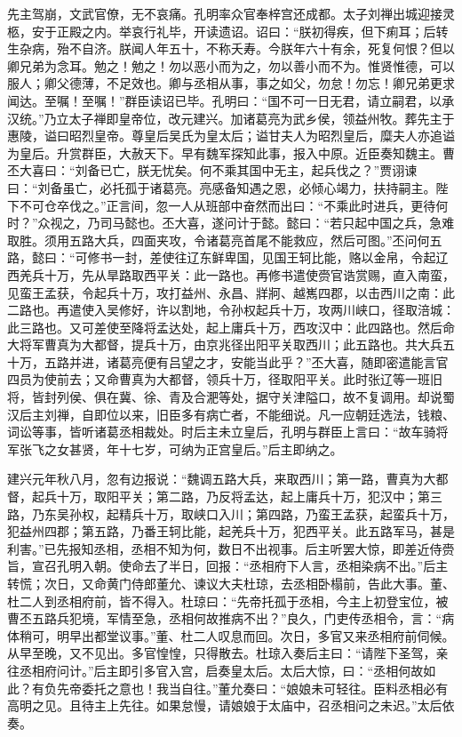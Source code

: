 先主驾崩，文武官僚，无不哀痛。孔明率众官奉梓宫还成都。太子刘禅出城迎接灵柩，安于正殿之内。举哀行礼毕，开读遗诏。诏曰：“朕初得疾，但下痢耳；后转生杂病，殆不自济。朕闻人年五十，不称夭寿。今朕年六十有余，死复何恨？但以卿兄弟为念耳。勉之！勉之！勿以恶小而为之，勿以善小而不为。惟贤惟德，可以服人；卿父德薄，不足效也。卿与丞相从事，事之如父，勿怠！勿忘！卿兄弟更求闻达。至嘱！至嘱！”群臣读诏已毕。孔明曰：“国不可一日无君，请立嗣君，以承汉统。”乃立太子禅即皇帝位，改元建兴。加诸葛亮为武乡侯，领益州牧。葬先主于惠陵，谥曰昭烈皇帝。尊皇后吴氏为皇太后；谥甘夫人为昭烈皇后，糜夫人亦追谥为皇后。升赏群臣，大赦天下。早有魏军探知此事，报入中原。近臣奏知魏主。曹丕大喜曰：“刘备已亡，朕无忧矣。何不乘其国中无主，起兵伐之？”贾诩谏曰：“刘备虽亡，必托孤于诸葛亮。亮感备知遇之恩，必倾心竭力，扶持嗣主。陛下不可仓卒伐之。”正言间，忽一人从班部中奋然而出曰：“不乘此时进兵，更待何时？”众视之，乃司马懿也。丕大喜，遂问计于懿。懿曰：“若只起中国之兵，急难取胜。须用五路大兵，四面夹攻，令诸葛亮首尾不能救应，然后可图。”丕问何五路，懿曰：“可修书一封，差使往辽东鲜卑国，见国王轲比能，赂以金帛，令起辽西羌兵十万，先从旱路取西平关：此一路也。再修书遣使赍官诰赏赐，直入南蛮，见蛮王孟获，令起兵十万，攻打益州、永昌、牂牁、越嶲四郡，以击西川之南：此二路也。再遣使入吴修好，许以割地，令孙权起兵十万，攻两川峡口，径取涪城：此三路也。又可差使至降将孟达处，起上庸兵十万，西攻汉中：此四路也。然后命大将军曹真为大都督，提兵十万，由京兆径出阳平关取西川；此五路也。共大兵五十万，五路并进，诸葛亮便有吕望之才，安能当此乎？”丕大喜，随即密遣能言官四员为使前去；又命曹真为大都督，领兵十万，径取阳平关。此时张辽等一班旧将，皆封列侯、俱在冀、徐、青及合淝等处，据守关津隘口，故不复调用。却说蜀汉后主刘禅，自即位以来，旧臣多有病亡者，不能细说。凡一应朝廷选法，钱粮、词讼等事，皆听诸葛丞相裁处。时后主未立皇后，孔明与群臣上言曰：“故车骑将军张飞之女甚贤，年十七岁，可纳为正宫皇后。”后主即纳之。

建兴元年秋八月，忽有边报说：“魏调五路大兵，来取西川；第一路，曹真为大都督，起兵十万，取阳平关；第二路，乃反将孟达，起上庸兵十万，犯汉中；第三路，乃东吴孙权，起精兵十万，取峡口入川；第四路，乃蛮王孟获，起蛮兵十万，犯益州四郡；第五路，乃番王轲比能，起羌兵十万，犯西平关。此五路军马，甚是利害。”已先报知丞相，丞相不知为何，数日不出视事。后主听罢大惊，即差近侍赍旨，宣召孔明入朝。使命去了半日，回报：“丞相府下人言，丞相染病不出。”后主转慌；次日，又命黄门侍郎董允、谏议大夫杜琼，去丞相卧榻前，告此大事。董、杜二人到丞相府前，皆不得入。杜琼曰：“先帝托孤于丞相，今主上初登宝位，被曹丕五路兵犯境，军情至急，丞相何故推病不出？”良久，门吏传丞相令，言：“病体稍可，明早出都堂议事。”董、杜二人叹息而回。次日，多官又来丞相府前伺候。从早至晚，又不见出。多官惶惶，只得散去。杜琼入奏后主曰：“请陛下圣驾，亲往丞相府问计。”后主即引多官入宫，启奏皇太后。太后大惊，曰：“丞相何故如此？有负先帝委托之意也！我当自往。”董允奏曰：“娘娘未可轻往。臣料丞相必有高明之见。且待主上先往。如果怠慢，请娘娘于太庙中，召丞相问之未迟。”太后依奏。

